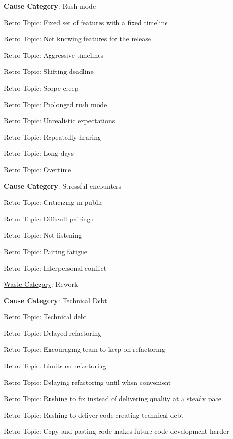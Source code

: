 \quad \textbf{Cause Category}: Rush mode

\quad \quad Retro Topic: Fixed set of features with a fixed timeline

\quad \quad Retro Topic: Not knowing features for the release

\quad \quad Retro Topic: Aggressive timelines

\quad \quad Retro Topic: Shifting deadline

\quad \quad Retro Topic: Scope creep

\quad \quad Retro Topic: Prolonged rush mode

\quad \quad Retro Topic: Unrealistic expectations

\quad \quad Retro Topic: Repeatedly hearing 

\quad \quad Retro Topic: Long days

\quad \quad Retro Topic: Overtime

\quad \textbf{Cause Category}:  Stressful encounters

\quad \quad Retro Topic: Criticizing in public

\quad \quad Retro Topic: Difficult pairings

\quad \quad Retro Topic: Not listening

\quad \quad Retro Topic: Pairing fatigue

\quad \quad Retro Topic: Interpersonal conflict









\underline{Waste Category}: Rework

\quad \textbf{Cause Category}: Technical Debt

\quad \quad Retro Topic: Technical debt

\quad \quad Retro Topic: Delayed refactoring

\quad \quad Retro Topic: Encouraging team to keep on refactoring

\quad \quad Retro Topic: Limits on refactoring

\quad \quad Retro Topic: Delaying refactoring until when convenient

\quad \quad Retro Topic: Rushing to fix  instead of delivering quality at a steady pace

\quad \quad Retro Topic: Rushing to deliver code creating technical debt

\quad \quad Retro Topic: Copy and pasting code makes future code development harder

